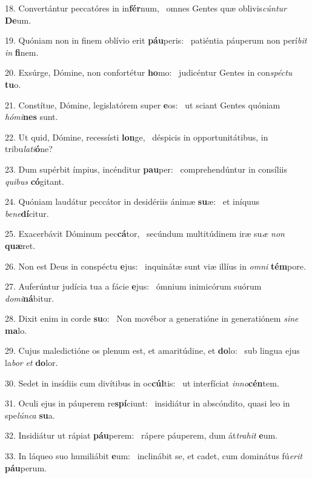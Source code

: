 18. Convertántur peccatóres in in\textbf{fér}num, \ast\  omnes Gentes quæ oblivis\textit{cún}\textit{tur} \textbf{De}um.\

19. Quóniam non in finem oblívio erit \textbf{páu}peris: \ast\  patiéntia páuperum non perí\textit{bit} \textit{in} \textbf{fi}nem.\

20. Exsúrge, Dómine, non confortétur \textbf{ho}mo: \ast\  judicéntur Gentes in con\textit{spéc}\textit{tu} \textbf{tu}o.\

21. Constítue, Dómine, legislatórem super \textbf{e}os: \ast\  ut sciant Gentes quóniam \textit{hó}\textit{mi}\textbf{nes} sunt.\

22. Ut quid, Dómine, recessísti \textbf{lon}ge, \ast\  déspicis in opportunitátibus, in tribu\textit{la}\textit{ti}\textbf{ó}ne?\

23. Dum supérbit ímpius, incénditur \textbf{pau}per: \ast\  comprehendúntur in consíliis \textit{qui}\textit{bus} \textbf{có}gitant.\

24. Quóniam laudátur peccátor in desidériis ánimæ \textbf{su}æ: \ast\  et iníquus \textit{be}\textit{ne}\textbf{dí}citur.\

25. Exacerbávit Dóminum pec\textbf{cá}tor, \ast\  secúndum multitúdinem iræ su\textit{æ} \textit{non} \textbf{quæ}ret.\

26. Non est Deus in conspéctu \textbf{e}jus: \ast\  inquinátæ sunt viæ illíus in \textit{om}\textit{ni} \textbf{tém}pore.\

27. Auferúntur judícia tua a fácie \textbf{e}jus: \ast\  ómnium inimicórum suórum \textit{do}\textit{mi}\textbf{ná}bitur.\

28. Dixit enim in corde \textbf{su}o: \ast\  Non movébor a generatióne in generatiónem \textit{si}\textit{ne} \textbf{ma}lo.\

29. Cujus maledictióne os plenum est, et amaritúdine, et \textbf{do}lo: \ast\  sub lingua ejus la\textit{bor} \textit{et} \textbf{do}lor.\

30. Sedet in insídiis cum divítibus in oc\textbf{cúl}tis: \ast\  ut interfíciat \textit{in}\textit{no}\textbf{cén}tem.\

31. Oculi ejus in páuperem re\textbf{spí}ciunt: \ast\  insidiátur in abscóndito, quasi leo in spe\textit{lún}\textit{ca} \textbf{su}a.\

32. Insidiátur ut rápiat \textbf{páu}perem: \ast\  rápere páuperem, dum át\textit{tra}\textit{hit} \textbf{e}um.\

33. In láqueo suo humiliábit \textbf{e}um: \ast\  inclinábit se, et cadet, cum dominátus fú\textit{e}\textit{rit} \textbf{páu}perum.\


